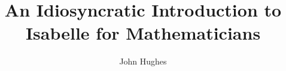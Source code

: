\documentclass[11pt,notitlepage,openany,oneside]{book}
\begin{document}
\title{An Idiosyncratic Introduction to Isabelle for Mathematicians}
\author{John Hughes}
\maketitle 
 

\tableofcontents











\end{document}
